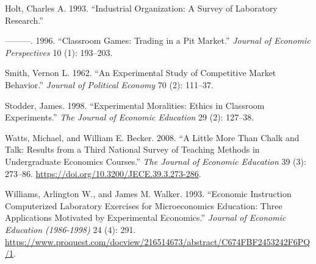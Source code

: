 \documentclass[
]{article}
\newlength{\cslhangindent}
\newlength{\cslentryspacingunit} %
\newenvironment{CSLReferences}[2] %
 {%
  \setlength{\parindent}{0pt}
  \ifodd #1
  \let\oldpar\par
  \def\par{\hangindent=\cslhangindent\oldpar}
  \fi
  \setlength{\parskip}{#2\cslentryspacingunit}
 }%
 {}
\begin{document}
\begin{CSLReferences}{1}{0}
\leavevmode{}%
Holt, Charles A. 1993. {``Industrial {Organization}: {A} {Survey} of
{Laboratory} {Research}.''}

\leavevmode{}%
---------. 1996. {``Classroom Games: {Trading} in a Pit Market.''}
\emph{Journal of Economic Perspectives} 10 (1): 193--203.

\leavevmode{}%
Smith, Vernon L. 1962. {``An Experimental Study of Competitive Market
Behavior.''} \emph{Journal of Political Economy} 70 (2): 111--37.

\leavevmode{}%
Stodder, James. 1998. {``Experimental Moralities: {Ethics} in Classroom
Experiments.''} \emph{The Journal of Economic Education} 29 (2):
127--38.

\leavevmode{}%
Watts, Michael, and William E. Becker. 2008. {``A {Little} {More} Than
{Chalk} and {Talk}: {Results} from a {Third} {National} {Survey} of
{Teaching} {Methods} in {Undergraduate} {Economics} {Courses}.''}
\emph{The Journal of Economic Education} 39 (3): 273--86.
\url{https://doi.org/10.3200/JECE.39.3.273-286}.

\leavevmode{}%
Williams, Arlington W., and James M. Walker. 1993. {``Economic
{Instruction} {Computerized} {Laboratory} {Exercises} for
{Microeconomics} {Education}: {Three} {Applications} {Motivated} by
{Experimental} {Economics}.''} \emph{Journal of Economic Education
(1986-1998)} 24 (4): 291.
\url{https://www.proquest.com/docview/216514673/abstract/C674FBF2453242F6PQ/1}.

\end{CSLReferences}
\end{document}
